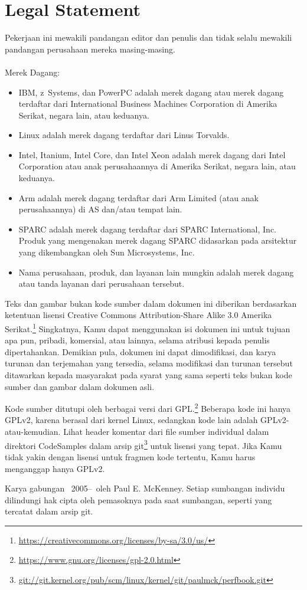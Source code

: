 
\section*{Legal Statement}

Pekerjaan ini mewakili pandangan editor dan penulis dan tidak selalu
mewakili pandangan perusahaan mereka masing-masing. \\
\\
Merek Dagang:
\begin{itemize}
\item IBM, z~Systems, dan PowerPC adalah merek dagang atau merek dagang terdaftar
	dari International Business Machines Corporation di
	Amerika Serikat, negara lain, atau keduanya.
\item Linux adalah merek dagang terdaftar dari Linus Torvalds.
\item Intel, Itanium, Intel Core, dan Intel Xeon adalah merek dagang
	dari Intel Corporation atau anak perusahaannya di Amerika Serikat,
	negara lain, atau keduanya.
\item Arm adalah merek dagang terdaftar dari Arm Limited (atau anak perusahaannya)
	di AS dan/atau tempat lain.
\item SPARC adalah merek dagang terdaftar dari SPARC International, Inc.
	Produk yang mengenakan merek dagang SPARC didasarkan pada arsitektur
	yang dikembangkan oleh Sun Microsystems, Inc.
\item Nama perusahaan, produk, dan layanan lain mungkin adalah merek dagang atau
	tanda layanan dari perusahaan tersebut.
\end{itemize}


Teks dan gambar bukan kode sumber dalam dokumen ini diberikan berdasarkan
ketentuan lisensi Creative Commons Attribution-Share Alike 3.0 Amerika Serikat.\footnote{
	\url{https://creativecommons.org/licenses/by-sa/3.0/us/}}
Singkatnya, Kamu dapat menggunakan isi dokumen ini untuk tujuan apa pun,
pribadi, komersial, atau lainnya, selama atribusi kepada
penulis dipertahankan.
Demikian pula, dokumen ini dapat dimodifikasi, dan karya turunan dan
terjemahan yang tersedia, selama modifikasi dan turunan tersebut
ditawarkan kepada masyarakat pada syarat yang sama seperti
teks bukan kode sumber dan gambar dalam dokumen asli.

Kode sumber ditutupi oleh berbagai versi dari GPL\@.\footnote{
	\url{https://www.gnu.org/licenses/gpl-2.0.html}}
Beberapa kode ini hanya GPLv2, karena berasal dari kernel Linux,
sedangkan kode lain adalah GPLv2-atau-kemudian.
Lihat header komentar dari file sumber individual dalam direktori
CodeSamples dalam arsip git\footnote{
	\url{git://git.kernel.org/pub/scm/linux/kernel/git/paulmck/perfbook.git}}
untuk lisensi yang tepat.
Jika Kamu tidak yakin dengan lisensi untuk fragmen kode tertentu,
Kamu harus menganggap hanya GPLv2.

Karya gabungan {\textcopyright}~2005--\commityear\ oleh Paul E. McKenney.
Setiap sumbangan individu dilindungi hak cipta oleh pemasoknya pada saat
sumbangan, seperti yang tercatat dalam arsip git.


